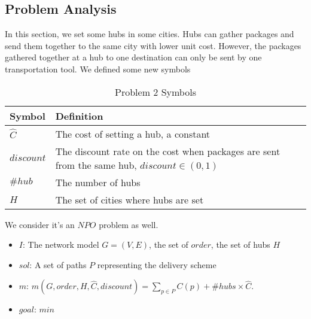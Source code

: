 \documentclass{llncs}
\begin{document}
\subsection{Problem Analysis}
In this section, we set some hubs in some cities. Hubs can gather packages and send them together to the same city with lower unit cost. However, the packages gathered together at a hub to one
destination can only be sent by one transportation tool. We defined some new symbols \\
\begin{table}
  \caption{Problem 2 Symbols}\label{sym2}
  \centering
  \begin{tabular}{|l|l|}
  \hline
  Symbol &  Definition \\
  \hline
  $\hat{C}$ & The cost of setting a hub, a constant\\
  \hline
  $discount$ & The discount rate on the cost when packages are sent from the same hub, $discount\in (0,1)$\\
  \hline
  $\#hub$ & The number of hubs \\
  \hline
  $H$ & The set of cities where hubs are set \\
  \hline
  \end{tabular}
\end{table}
We consider it's an $NPO$ problem as well.
\begin{itemize}
  \item $I$: The network model $G=(V,E)$, the set of $order$, the set of hubs $H$
  \item $sol$: A set of paths $P$ representing the delivery scheme
  \item $m$: $m(G,order,H,\hat{C},discount)=\sum_{p \in P}C(p)+\#hubs\times\hat{C}$.
  \item $goal$: $min$
\end{itemize}
\end{document}
